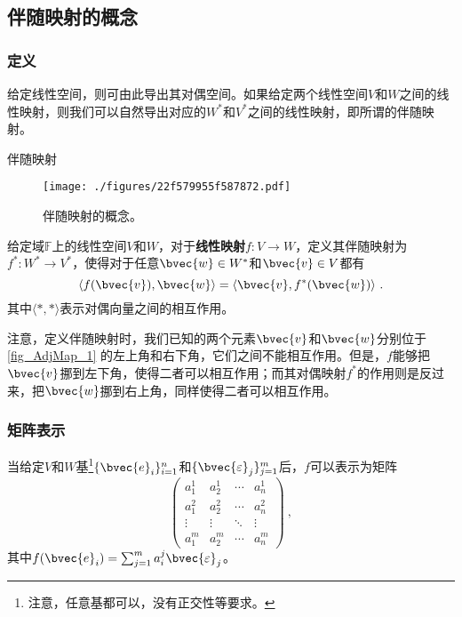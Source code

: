 


\subsection{伴随映射的概念}


\subsubsection{定义}

给定线性空间，则可由此导出其对偶空间。如果给定两个线性空间$V$和$W$之间的线性映射，则我们可以自然导出对应的$W^*$和$V^*$之间的线性映射，即所谓的伴随映射。



\begin{definition}{伴随映射}

\begin{figure}[ht]
\centering
\texttt{[image: ./figures/22f579955f587872.pdf]}
\caption{伴随映射的概念。} \label{fig_AdjMap_1}
\end{figure}

给定域$\mathbb{F}$上的线性空间$V$和$W$，对于\textbf{线性映射}$f:V\to W$，定义其伴随映射为$f^*:W^*\to V^*$，使得对于任意$\bvec{w}\in W^*$和$\bvec{v}\in V$都有
\begin{equation}
\langle f(\bvec{v}), \bvec{w} \rangle = \langle \bvec{v}, f^*(\bvec{w}) \rangle~. 
\end{equation}
其中$\langle *, * \rangle$表示对偶向量之间的相互作用。
\end{definition}

注意，定义伴随映射时，我们已知的两个元素$\bvec{v}$和$\bvec{w}$分别位于\autoref{fig_AdjMap_1} 的左上角和右下角，它们之间不能相互作用。但是，$f$能够把$\bvec{v}$挪到左下角，使得二者可以相互作用；而其对偶映射$f^*$的作用则是反过来，把$\bvec{w}$挪到右上角，同样使得二者可以相互作用。



\subsubsection{矩阵表示}


当给定$V$和$W$基\footnote{注意，任意基都可以，没有正交性等要求。}$\{\bvec{e}_i\}_{i=1}^n$和$\{\bvec{\varepsilon}_j\}_{j=1}^m$后，$f$可以表示为矩阵
\begin{equation}
\begin{pmatrix}
a^1_1&a^1_2&\cdots&a^1_n\\
a^2_1&a^2_2&\cdots&a^2_n\\
\vdots&\vdots&\ddots&\vdots\\
a^m_1&a^m_2&\cdots&a^m_n
\end{pmatrix}~, 
\end{equation}
其中$f(\bvec{e}_i)=\sum_{j=1}^m a^j_i\bvec{\varepsilon}_j$。


